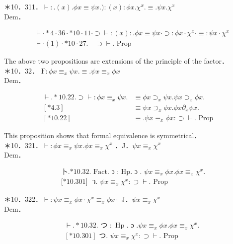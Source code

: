 \documentclass[10pt]{article}
\begin{document}
＊10．311．$\vdash: .(x) . \phi x \equiv \psi x.):(x): \phi x . \chi^{x} . \equiv . \psi x . \chi^{x}$\\
Dem．


\begin{align*}
& \vdash \cdot * 4 \cdot 36 \cdot * 10 \cdot 11 \cdot \supset \vdash:(x): . \phi x \equiv \psi x \cdot \supset: \phi x \cdot \chi^{x} \cdot \equiv: \psi x \cdot \chi^{x}  \tag{1}\\
& \vdash \cdot(1) \cdot * 10 \cdot 27 . \quad \supset \vdash . \text { Prop }
\end{align*}


The above two propositions are extensions of the principle of the factor．\\
＊10．32． $\mathrm{F}: \phi x \equiv_{x} \psi x . \equiv . \psi x \equiv_{x} \phi x$\\
Dem．

$$
\begin{aligned}
\vdash . * 10.22 . \supset \vdash: \phi x \equiv_{x} \psi x . & \equiv \phi x \supset_{x} \psi x . \psi x \supset_{x} \phi x . \\
{[* 4.3] } & \equiv \psi x \supset_{x} \phi x . \phi x \partial_{x} \psi x . \\
{[* 10.22] } & \equiv . \psi x \equiv_{x} \phi x: \supset \vdash . \text { Prop }
\end{aligned}
$$

This proposition shows that formal equivalence is symmetrical．\\
＊10．321．$\vdash: \phi x \equiv_{x} \psi x . \phi x \equiv_{x} \chi^{x}$ ．J．$\psi x \equiv_{x} \chi^{x}$\\
Dem．

$$
\begin{aligned}
& \text { 卜.*10.32. Fact. ɔ : Hp. ɔ . } \psi x \equiv_{x} \phi x . \phi x \equiv_{x} \chi^{x} . \\
& \text { [*10.301] } \text { ว. } \psi x \equiv_{x} \chi^{x}: \supset \vdash . \text { Prop }
\end{aligned}
$$

＊10．322．$\vdash: \psi x \equiv_{x} \phi x \cdot \chi^{x} \equiv_{x} \phi x \cdot$ J．$\psi x \equiv_{x} \chi^{x}$\\
Dem．

$$
\begin{aligned}
& \vdash . * 10.32 . \text { つ }: \text { Hp } . \text { ɔ } . \psi x \equiv_{x} \phi x . \phi x \equiv_{x} \chi^{x} . \\
& {[* 10.301] \text { つ. } \psi x \equiv_{x} \chi^{x}: \supset \vdash . \text { Prop }}
\end{aligned}
$$
\end{document}
